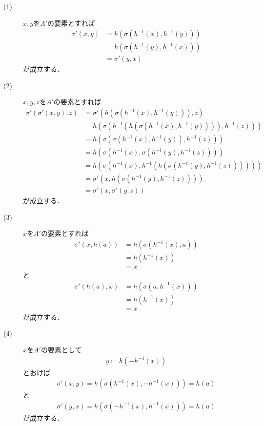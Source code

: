 	\begin{prf}\mbox{}
		\begin{description}
			\item[(1)] $x,y$を$A'$の要素とすれば
				\begin{align}
					\sigma'(x,y) &= h\left(\sigma(h^{-1}(x),h^{-1}(y))\right) \\
					&= h\left(\sigma(h^{-1}(y),h^{-1}(x))\right) \\
					&= \sigma'(y,x)
				\end{align}
				が成立する．
				
			\item[(2)] $x,y,z$を$A'$の要素とすれば
				\begin{align}
					\sigma'\left( \sigma'(x,y),z \right)
					&= \sigma'\left( h\left(\sigma(h^{-1}(x),h^{-1}(y))\right),z \right) \\
					&= h\left(\sigma\left(h^{-1}\left( h\left(\sigma\left(h^{-1}(x),h^{-1}(y)\right)\right) \right),h^{-1}(z)\right)\right) \\
					&= h\left(\sigma\left(\sigma\left(h^{-1}(x),h^{-1}(y)\right),h^{-1}(z)\right)\right) \\
					&= h\left(\sigma\left(h^{-1}(x),\sigma\left(h^{-1}(y),h^{-1}(z)\right)\right)\right) \\
					&= h\left(\sigma\left(h^{-1}(x),h^{-1}\left(h\left(\sigma\left(h^{-1}(y),h^{-1}(z)\right)\right)\right)\right)\right) \\
					&= \sigma'\left( x,h\left(\sigma(h^{-1}(y),h^{-1}(z))\right) \right) \\
					&= \sigma'\left(x,\sigma'\left(y,z\right)\right)
				\end{align}
				が成立する．
			
			\item[(3)] $x$を$A'$の要素とすれば
				\begin{align}
					\sigma'(x,h(a)) &= h\left(\sigma(h^{-1}(x),a)\right) \\
					&= h\left(h^{-1}(x)\right) \\
					&= x
				\end{align}
				と
				\begin{align}
					\sigma'(h(a),x) &= h\left(\sigma(a,h^{-1}(x))\right) \\
					&= h\left(h^{-1}(x)\right) \\
					&= x
				\end{align}
				が成立する．
				
			\item[(4)] $x$を$A'$の要素として
				\begin{align}
					y \coloneqq h\left(-h^{-1}(x)\right)
				\end{align}
				とおけば
				\begin{align}
					\sigma'(x,y) = h\left(\sigma(h^{-1}(x),-h^{-1}(x))\right) = h(a)
				\end{align}
				と
				\begin{align}
					\sigma'(y,x) = h\left(\sigma(-h^{-1}(x),h^{-1}(x))\right) = h(a)
				\end{align}
				が成立する．
		\end{description}
	\end{prf}

